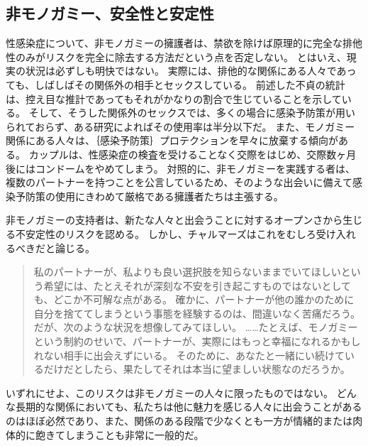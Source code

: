 \documentclass[paper=a4,book,openany]{jlreq}
\begin{document}
\subsection{非モノガミー、安全性と安定性}

性感染症について、非モノガミーの擁護者は、禁欲を除けば原理的に完全な排他性のみがリスクを完全に除去する方法だという点を否定しない。
とはいえ、現実の状況は必ずしも明快ではない。
実際には、排他的な関係にある人々であっても、しばしばその関係外の相手とセックスしている。
前述した不貞の統計は、控え目な推計であってもそれがかなりの割合で生じていることを示している。
そして、そうした関係外のセックスでは、多くの場合に感染予防策が用いられておらず、ある研究によればその使用率は半分以下だ\citep{conley12:_unfait_indiv_are_less_likel}。
また、モノガミー関係にある人々は、｛感染予防策｝{プロテクション}を早々に放棄する傾向がある。
カップルは、性感染症の検査を受けることなく交際をはじめ、交際数ヶ月後にはコンドームをやめてしまう\citep{glauser11:_how_talk_patien_sti_screen}。
対照的に、非モノガミーを実践する者は、複数のパートナーを持つことを公言しているため、そのような出会いに備えて感染予防策の使用にきわめて厳格である擁護者たちは主張する\citep{soh16:_insig_kinky_nonmon_sex}。

非モノガミーの支持者は、新たな人々と出会うことに対するオープンさから生じる不安定性のリスクを認める。
しかし、チャルマーズはこれをむしろ受け入れるべきだと論じる。

\begin{quote}
私のパートナーが、私よりも良い選択肢を知らないままでいてほしいという希望には、たとえそれが深刻な不安を引き起こすものではないとしても、どこか不可解な点がある。
確かに、パートナーが他の誰かのために自分を捨ててしまうという事態を経験するのは、間違いなく苦痛だろう。
だが、次のような状況を想像してみてほしい。
……たとえば、モノガミーという制約のせいで、パートナーが、実際にはもっと幸福になれるかもしれない相手に出会えずにいる。
そのために、あなたと一緒にい続けているだけだとしたら、果たしてそれは本当に望ましい状態なのだろうか\citep{chalmers19:_is_monog_moral_permis}。
\end{quote}

いずれにせよ、このリスクは非モノガミーの人々に限ったものではない。
どんな長期的な関係においても、私たちは他に魅力を感じる人々に出会うことがあるのはほぼ必然であり、また、関係のある段階で少なくとも一方が情緒的または肉体的に飽きてしまうことも非常に一般的だ。
\end{document}
